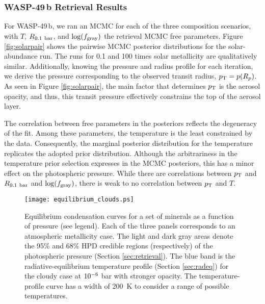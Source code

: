 \documentclass[tighten, times, twocolumn]{aastex61}  %
\newcommand\ttt[1]{10\sp{#1}}
\newcommand\comment[1]{}
\let\oldmsp=\sp
\let\oldmsb=\sb
\def\sp#1{\ifmmode
           \oldmsp{#1}%
         \else\strut\raise.85ex\hbox{\scriptsize #1}\fi}
\def\sb#1{\ifmmode
           \oldmsb{#1}%
         \else\strut\raise-.54ex\hbox{\scriptsize #1}\fi}
\begin{document}
\subsubsection{WASP-49\,b Retrieval Results}
\label{sec:w49results}

For WASP-49\,b, we ran an MCMC for each of the three composition
scenarios, with $T$, $R\sb{0.1\ {\rm bar}}$, and $\log(f\sb{\rm
gray})$ the retrieval MCMC free parameters.
Figure \ref{fig:solarpair} shows the pairwise MCMC posterior
distributions for the solar-abundance run.  The runs for 0.1 and 100
times solar metallicity are qualitatively similar.
Additionally, knowing the pressure and radius profile for each
iteration, we derive the pressure corresponding to the observed
transit radius, $p\sb{\rm T} = p(R\sb{p})$.  As seen in
Figure \ref{fig:solarpair}, the main factor that
determines $p\sb{\rm T}$ is the aerosol opacity, and thus, this
transit pressure effectively constrains the top of the aerosol layer.

The correlation between free parameters in the posteriors reflects the
degeneracy of the fit.  Among these parameters, the temperature is the
least constrained by the data.  Consequently, the marginal posterior
distribution for the temperature replicates the adopted prior
distribution.
Although the arbitrariness in the temperature prior selection
expresses in the MCMC posteriors, this has a minor effect on the
photospheric pressure.  While
there are correlations between $p\sb{\rm T}$ and $R\sb{0.1\ {\rm
bar}}$ and $\log(f\sb{\rm gray})$, there is weak to no correlation
between $p\sb{\rm T}$ and $T$.

\begin{figure*}[t]
\centering
\texttt{[image: equilibrium\_clouds.ps]}
\caption{Equilibrium condensation curves for a set of minerals 
as a function of pressure (see legend).  Each of the three panels
corresponds to an atmospheric metallicity case.  The light and dark
gray areas denote the 95\% and 68\% HPD credible regions
(respectively) of the photospheric pressure
(Section \ref{sec:retrieval}).  The blue band is the
radiative-equilibrium temperature profile (Section \ref{sec:radeq})
for the cloudy case at $\ttt{-6}$ bar with stronger opacity.   The
temperature-profile curve has a width of 200~K to consider a range of
possible temperatures. \comment{\vspace{0.5cm}}}
\label{fig:eqclouds}
\end{figure*}
\end{document}
